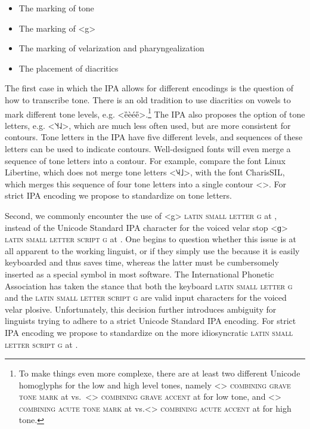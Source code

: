 \begin{itemize}
  \item The marking of tone
  \item The marking of <g>
  \item The marking of velarization and pharyngealization
  \item The placement of diacritics
\end{itemize}

The first case in which the IPA allows for different encodings is the question
of how to transcribe tone. There is an old tradition to use diacritics on vowels
to mark different tone levels, e.g. <ȅèée̋>.\footnote{To make things even more
complexe, there are at least two different Unicode homoglyphs for the low and
high level tones, namely <> \textsc{combining grave tone mark} at
 vs.~<> \textsc{combining grave accent} at  for
low tone, and <> \textsc{combining acute tone mark} at 
vs.<> \textsc{combining acute accent} at  for high tone.}
The IPA also proposes the option of tone letters, e.g. <˥˦˧˨˩>, which are much
less often used, but are more consistent for contours. Tone letters in the IPA
have five different levels, and sequences of these letters can be used to
indicate contours. Well-designed fonts will even merge a sequence of tone
letters into a contour. For example, compare the font Linux Libertine, which
does not merge tone letters <{˥˨˧˩}>, with the font
CharisSIL, which merges this sequence of four tone letters into a single contour
<>. For strict IPA encoding we propose to standardize on tone
letters.

Second, we commonly encounter the use of <g> \textsc{latin small letter g} at
, instead of the Unicode Standard IPA character for the voiced velar
stop <ɡ> \textsc{latin small letter script g} at . One begins to
question whether this issue is at all apparent to the working linguist, or if
they simply use the  because it is easily keyboarded and thus saves
time, whereas the latter must be cumbersomely inserted as a special symbol in
most software. The International Phonetic Association has taken the stance that
both the keyboard \textsc{latin small letter g} and the \textsc{latin small
letter script g} are valid input characters for the voiced velar plosive.
Unfortunately, this decision further introduces ambiguity for linguists trying
to adhere to a strict Unicode Standard IPA encoding. For strict IPA encoding we
propose to standardize on the more idiosyncratic \textsc{latin small letter
script g} at .


